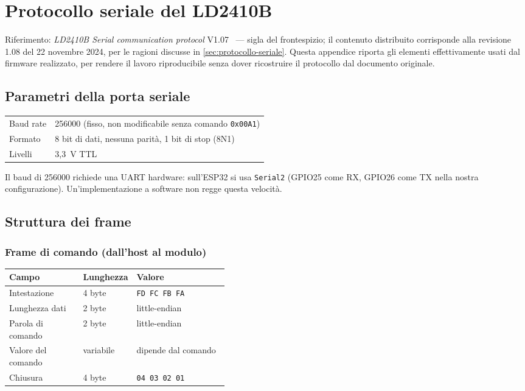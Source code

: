 \chapter{Protocollo seriale del LD2410B}
\label{app:protocollo}

Riferimento: \emph{LD2410B Serial communication protocol}
V1.07~\cite{hilinkProtoV107} --- sigla del frontespizio; il contenuto distribuito
corrisponde alla revisione 1.08 del 22 novembre 2024, per le ragioni discusse in
\cref{sec:protocollo-seriale}. Questa appendice riporta gli elementi effettivamente
usati dal firmware realizzato, per rendere il lavoro riproducibile senza dover
ricostruire il protocollo dal documento originale.

\section{Parametri della porta seriale}

\begin{center}\small
\begin{tabular}{@{}ll@{}}
\toprule
Baud rate & 256000 (fisso, non modificabile senza comando \texttt{0x00A1}) \\
Formato & 8 bit di dati, nessuna parità, 1 bit di stop (8N1) \\
Livelli & 3,3~V TTL \\
\bottomrule
\end{tabular}
\end{center}

Il baud di 256000 richiede una UART hardware: sull'ESP32 si usa \texttt{Serial2}
(GPIO25 come RX, GPIO26 come TX nella nostra configurazione). Un'implementazione a
software non regge questa velocità.

\section{Struttura dei frame}

\subsection{Frame di comando (dall'host al modulo)}

\begin{center}\small
\begin{tabular}{@{}llp{0.42\linewidth}@{}}
\toprule
\textbf{Campo} & \textbf{Lunghezza} & \textbf{Valore} \\
\midrule
Intestazione & 4 byte & \texttt{FD FC FB FA} \\
Lunghezza dati & 2 byte & little-endian \\
Parola di comando & 2 byte & little-endian \\
Valore del comando & variabile & dipende dal comando \\
Chiusura & 4 byte & \texttt{04 03 02 01} \\
\bottomrule
\end{tabular}
\end{center}


